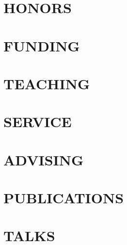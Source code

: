 \documentclass[margin]{res}
\begin{document}
\begin{resume}
\section{HONORS}


\section{FUNDING}


\section{TEACHING}


\section{SERVICE}


\section{ADVISING}


\section{PUBLICATIONS}




\section{TALKS}


\end{resume}
\end{document}
